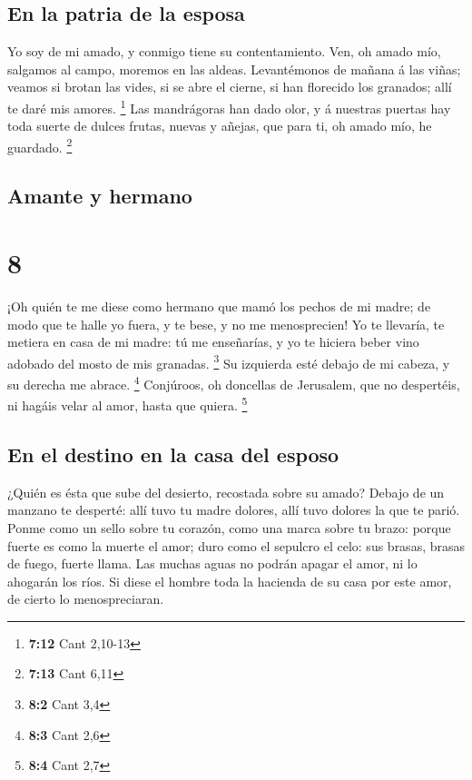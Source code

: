 \hypertarget{en-la-patria-de-la-esposa}{%
\subsection{En la patria de la esposa}\label{en-la-patria-de-la-esposa}}

 Yo soy de mi amado, y conmigo tiene su contentamiento.
 Ven, oh amado mío, salgamos al campo, moremos en las
aldeas.  Levantémonos de mañana á las viñas; veamos si
brotan las vides, si se abre el cierne, si han florecido los granados;
allí te daré mis amores. \footnote{\textbf{7:12} Cant 2,10-13}
 Las mandrágoras han dado olor, y á nuestras puertas hay
toda suerte de dulces frutas, nuevas y añejas, que para ti, oh amado
mío, he guardado. \footnote{\textbf{7:13} Cant 6,11}

\hypertarget{amante-y-hermano}{%
\subsection{Amante y hermano}\label{amante-y-hermano}}

\hypertarget{section-7}{%
\section{8}\label{section-7}}

 ¡Oh quién te me diese como hermano que mamó los pechos de
mi madre; de modo que te halle yo fuera, y te bese, y no me
menosprecien!  Yo te llevaría, te metiera en casa de mi
madre: tú me enseñarías, y yo te hiciera beber vino adobado del mosto de
mis granadas. \footnote{\textbf{8:2} Cant 3,4}  Su izquierda
esté debajo de mi cabeza, y su derecha me abrace. \footnote{\textbf{8:3}
  Cant 2,6}  Conjúroos, oh doncellas de Jerusalem, que no
despertéis, ni hagáis velar al amor, hasta que quiera. \footnote{\textbf{8:4}
  Cant 2,7}

\hypertarget{en-el-destino-en-la-casa-del-esposo}{%
\subsection{En el destino en la casa del
esposo}\label{en-el-destino-en-la-casa-del-esposo}}

 ¿Quién es ésta que sube del desierto, recostada sobre su
amado? Debajo de un manzano te desperté: allí tuvo tu madre dolores,
allí tuvo dolores la que te parió.  Ponme como un sello
sobre tu corazón, como una marca sobre tu brazo: porque fuerte es como
la muerte el amor; duro como el sepulcro el celo: sus brasas, brasas de
fuego, fuerte llama.  Las muchas aguas no podrán apagar el
amor, ni lo ahogarán los ríos. Si diese el hombre toda la hacienda de su
casa por este amor, de cierto lo menospreciaran.

